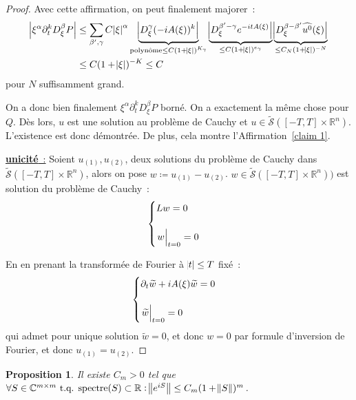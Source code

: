 \documentclass{report}
\DeclareMathOperator{\spectreOperator}{spectre\!}
\newcommand{\C}{{\mathbb C}}
\newcommand{\R}{{\mathbb R}}
\newcommand{\tq}{\text{ t.q. }}
\newcommand{\st}{\tq}
\newcommand{\spectre}[1]{{\spectreOperator\left(#1\right)}}
\newcommand{\restr}[2]{\left.#1\vphantom{\big|}\right|_{#2}}
\newcommand{\unic}{{\underline {\textbf{unicité}~:}} }
\newtheorem{prp}[thm]{Proposition}
\theoremstyle{definition}
\theoremstyle{remark}
\begin{document}
\begin{proof}
Avec cette affirmation, on peut finalement majorer~:
\begin{align*}
	\abs {\xi^\alpha\partial_t^kD_\xi^\beta P}
	&\leq \sum_{\beta',\gamma}C\abs \xi^\alpha\underbrace {\abs {D_\xi^\gamma (-iA(\xi))^k}}_{\text{polynôme} \leq C(1+\abs\xi)^{K_\gamma}}\underbrace {\abs {D_\xi^{\beta'-\gamma}e^{-itA(\xi)}}}_{\leq C(1+\abs\xi)^{e_\gamma}}\underbrace {\abs {D_\xi^{\beta-\beta'}\widehat {u^0}(\xi)}}_{\leq C_N(1+\abs\xi)^{-N}} \\
	&\leq C(1+\abs\xi)^{-K} \leq C
\end{align*}
pour $N$ suffisamment grand.

On a donc bien finalement $\xi^\alpha\partial_t^kD_\xi^\beta P$ borné. On a exactement la même chose pour $Q$. Dès lors, $u$ est une solution au problème de Cauchy
et $u \in \widetilde {\mathcal S}([-T, T] \times \R^n)$. L'existence est donc démontrée. De plus, cela montre l'Affirmation~\ref{claim 1}.

\unic Soient $u_{(1)}, u_{(2)}$, deux solutions du problème de Cauchy dans $\widetilde {\mathcal S}([-T, T] \times \R^n)$, alors on pose $w \coloneqq u_{(1)} - u_{(2)}$.
$w \in \widetilde {\mathcal S}([-T, T] \times \R^n))$ est solution du problème de Cauchy~:
\[\begin{cases}Lw = 0\\&\\\restr w{t=0} = 0\end{cases}\]

En en prenant la transformée de Fourier à $\abs t \leq T$ fixé~:
\[\begin{cases}\partial_t\widetilde w + iA(\xi)\widetilde w = 0\\&\\\restr {\widetilde w}{t=0} = 0\end{cases}\]
qui admet pour unique solution $\widetilde w = 0$, et donc $w = 0$ par formule d'inversion de Fourier, et donc $u_{(1)} = u_{(2)}$.
\end{proof}

\begin{prp} Il existe $C_m > 0$ tel que $\forall S \in \C^{m \times m} \st \spectre S \subset \R : \norm {e^{iS}} \leq C_m(1+\norm S)^m$.
\end{prp}
\end{document}
